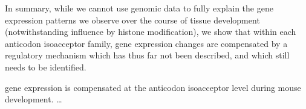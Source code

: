 In summary, while we cannot use genomic data to fully explain the \trna gene
expression patterns we observe over the course of tissue development
(notwithstanding influence by histone modification), we show that within each
anticodon isoacceptor family, \trna gene expression changes are compensated by
a regulatory mechanism which has thus far not been described, and which still
needs to be identified.

    {\trna gene expression is compensated at the anticodon isoacceptor level
    during mouse development.}
    {…}
